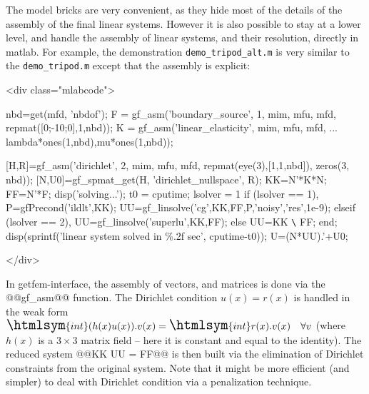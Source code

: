 \documentclass[11pt,a4paper]{article}
\newcommand{\sf}[1]{#1}
\newcommand{\int}{{\Large\htmlsym{int}}}
\newenvironment{mcode}{\begin{rawxml}<div class="mlabcode">\end{rawxml}\begin{example}}{\end{example}\begin{rawxml}</div>\end{rawxml}}
\newenvironment{mcode}{\begin{alltt}}{\end{alltt}}
\newcommand{\mlab}{{\sf matlab}\xspace}
\newcommand{\gfi}{{\sf getfem-interface}\xspace}
\begin{document}
The model bricks are very convenient, as they hide most of the details
of the assembly of the final linear systems. However it is also
possible to stay at a lower level, and handle the assembly of linear
systems, and their resolution, directly in \mlab. For example, the
demonstration \texttt{demo\_tripod\_alt.m} is very similar to the
\texttt{demo\_tripod.m} except that the assembly is explicit:

\begin{mcode}
nbd=get(mfd, 'nbdof');
F = gf_asm('boundary_source', 1, mim, mfu, mfd, repmat([0;-10;0],1,nbd));
K = gf_asm('linear_elasticity', mim, mfu, mfd, ...
	   lambda*ones(1,nbd),mu*ones(1,nbd));

[H,R]=gf_asm('dirichlet', 2, mim, mfu, mfd, repmat(eye(3),[1,1,nbd]), zeros(3, nbd));
[N,U0]=gf_spmat_get(H, 'dirichlet_nullspace', R);
KK=N'*K*N;
FF=N'*F;
disp('solving...'); t0 = cputime;
lsolver = 1 %
if (lsolver == 1),     %
  P=gfPrecond('ildlt',KK);
  UU=gf_linsolve('cg',KK,FF,P,'noisy','res',1e-9);
elseif (lsolver == 2), %
  UU=gf_linsolve('superlu',KK,FF);
else                   %
  UU=KK \verb+\+ FF;
end;
disp(sprintf('linear system solved in \%.2f sec', cputime-t0));
U=(N*UU).'+U0;
\end{mcode}

In \gfi, the assembly of vectors, and matrices is done via the
@@gf\_asm@@ function. The Dirichlet condition $u(x) = r(x)$ is handled
in the weak form $\int (h(x)u(x)).v(x) = \int r(x).v(x)\quad \forall v$ (where
$h(x)$ is a $3\times3$ matrix field -- here it is constant and equal to the
identity). The reduced system @@KK UU = FF@@ is then built via the
elimination of Dirichlet constraints from the original system. Note
that it might be more efficient (and simpler) to deal with Dirichlet
condition via a penalization technique.
\end{document}
